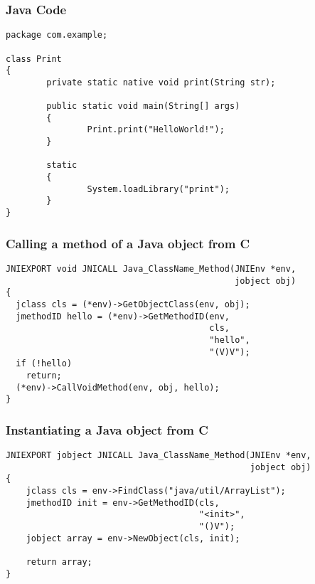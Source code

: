 \begin{frame}[fragile]
  \frametitle{Java Code}
\begin{verbatim}
package com.example;

class Print
{
        private static native void print(String str);

        public static void main(String[] args)
        {
                Print.print("HelloWorld!");
        }

        static
        {
                System.loadLibrary("print");
        }
}
\end{verbatim}
\end{frame}

\begin{frame}[fragile]
  \frametitle{Calling a method of a Java object from C}
\begin{verbatim}
JNIEXPORT void JNICALL Java_ClassName_Method(JNIEnv *env,
                                             jobject obj)
{
  jclass cls = (*env)->GetObjectClass(env, obj);
  jmethodID hello = (*env)->GetMethodID(env,
                                        cls,
                                        "hello",
                                        "(V)V");
  if (!hello)
    return;
  (*env)->CallVoidMethod(env, obj, hello);
}
\end{verbatim}
\end{frame}

\begin{frame}[fragile]
  \frametitle{Instantiating a Java object from C}
\begin{verbatim}
JNIEXPORT jobject JNICALL Java_ClassName_Method(JNIEnv *env,
                                                jobject obj)
{
    jclass cls = env->FindClass("java/util/ArrayList");
    jmethodID init = env->GetMethodID(cls,
                                      "<init>",
                                      "()V");
    jobject array = env->NewObject(cls, init);

    return array;
}
\end{verbatim}
\end{frame}

